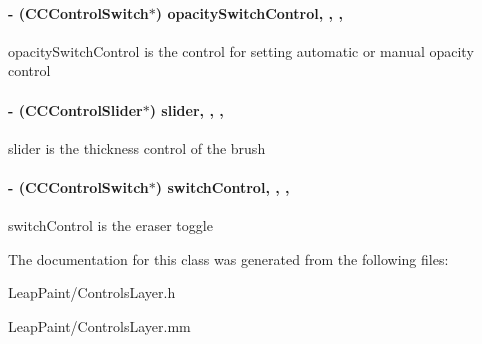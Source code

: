 \hypertarget{interface_controls_layer_ad2bbac273b79a99c46e66c61ea66c88b}{
\paragraph[{opacity\-Switch\-Control}]{\setlength{\rightskip}{0pt plus 5cm}-\/ (C\-C\-Control\-Switch$\ast$) opacity\-Switch\-Control\hspace{0.3cm}{\ttfamily [read]}, {\ttfamily [write]}, {\ttfamily [nonatomic]}, {\ttfamily [strong]}}}\label{d1/d1a/interface_controls_layer_ad2bbac273b79a99c46e66c61ea66c88b}
opacity\-Switch\-Control is the control for setting automatic or manual opacity control \hypertarget{interface_controls_layer_a599701380c37caf4e656efaa860469a3}{
\paragraph[{slider}]{\setlength{\rightskip}{0pt plus 5cm}-\/ (C\-C\-Control\-Slider$\ast$) slider\hspace{0.3cm}{\ttfamily [read]}, {\ttfamily [write]}, {\ttfamily [nonatomic]}, {\ttfamily [strong]}}}\label{d1/d1a/interface_controls_layer_a599701380c37caf4e656efaa860469a3}
slider is the thickness control of the brush \hypertarget{interface_controls_layer_a8997cfae8a4f6bcfb8c53d8cab6bb480}{
\paragraph[{switch\-Control}]{\setlength{\rightskip}{0pt plus 5cm}-\/ (C\-C\-Control\-Switch$\ast$) switch\-Control\hspace{0.3cm}{\ttfamily [read]}, {\ttfamily [write]}, {\ttfamily [nonatomic]}, {\ttfamily [strong]}}}\label{d1/d1a/interface_controls_layer_a8997cfae8a4f6bcfb8c53d8cab6bb480}
switch\-Control is the eraser toggle 

The documentation for this class was generated from the following files\-:\begin{DoxyCompactItemize}
\item 
Leap\-Paint/Controls\-Layer.\-h\item 
Leap\-Paint/Controls\-Layer.\-mm\end{DoxyCompactItemize}
